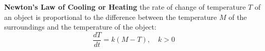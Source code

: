 \documentclass{beamer}
\begin{document}
\begin{frame}
\begin{example}
\textbf{Newton's Law of Cooling or Heating} the rate of change of temperature $T$ of an object is proportional to the difference between the temperature $M$ of the surroundings and the temperature of the object:
\begin{equation*}
\dfrac{dT}{dt}=k(M-T),\quad k>0
\end{equation*}
\end{example}
\end{frame}
\end{document}
